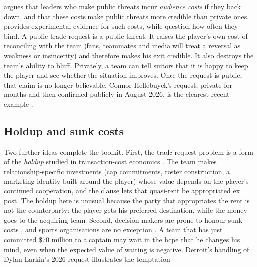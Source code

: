 \citet{fearon1994} argues that leaders who make public threats incur \emph{audience costs} if they back down, and that these costs make public threats more credible than private ones. \citet{tomz2007} provides experimental evidence for such costs, while \citet{snyderborghard2011} question how often they bind. A public trade request is a public threat. It raises the player's own cost of reconciling with the team (fans, teammates and media will treat a reversal as weakness or insincerity) and therefore makes his exit credible. It also destroys the team's ability to bluff. Privately, a team can tell suitors that it is happy to keep the player and see whether the situation improves. Once the request is public, that claim is no longer believable. Connor Hellebuyck's request, private for months and then confirmed publicly in August 2026, is the clearest recent example \citep{thw_larkin_hellebuyck,br_hellebuyck}.

\subsection{Holdup and sunk costs}

Two further ideas complete the toolkit. First, the trade-request problem is a form of the \emph{holdup} studied in transaction-cost economics \citep{kca1978,williamson1979,williamson1985}. The team makes relationship-specific investments (cap commitments, roster construction, a marketing identity built around the player) whose value depends on the player's continued cooperation, and the clause lets that quasi-rent be appropriated ex post. The holdup here is unusual because the party that appropriates the rent is not the counterparty: the player gets his preferred destination, while the money goes to the acquiring team. Second, decision makers are prone to honour sunk costs \citep{arkesblumer1985,staw1976}, and sports organisations are no exception \citep{stawhoang1995,camererweber1999}. A team that has just committed \$70 million to a captain may wait in the hope that he changes his mind, even when the expected value of waiting is negative. Detroit's handling of Dylan Larkin's 2026 request illustrates the temptation.
